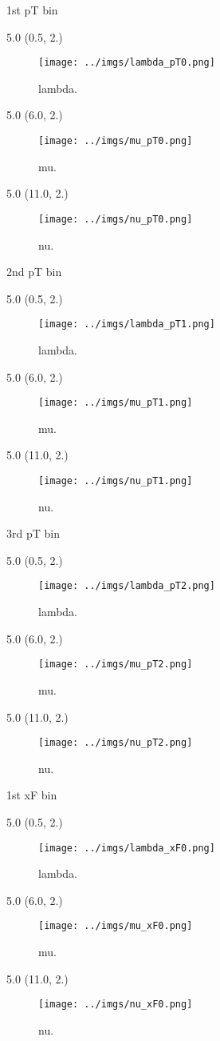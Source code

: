 \documentclass[12pt, xcolor={dvipsnames}, aspectratio = 169, sans,mathserif]{beamer}
\newenvironment{Pic}[2]
{
\begin{textblock}{#1} #2
\begin{figure}
}
{
\end{figure}
\end{textblock}
}
\begin{document}
%
%
%
\begin{frame}{1st pT bin}
\begin{Pic}{5.0}{(0.5, 2.)}
  \texttt{[image: ../imgs/lambda\_pT0.png]}
  \caption{lambda.}
\end{Pic}

\begin{Pic}{5.0}{(6.0, 2.)}
  \texttt{[image: ../imgs/mu\_pT0.png]}
  \caption{mu.}
\end{Pic}

\begin{Pic}{5.0}{(11.0, 2.)}
  \texttt{[image: ../imgs/nu\_pT0.png]}
  \caption{nu.}
\end{Pic}
\end{frame}

%
%
%
\begin{frame}{2nd pT bin}
\begin{Pic}{5.0}{(0.5, 2.)}
  \texttt{[image: ../imgs/lambda\_pT1.png]}
  \caption{lambda.}
\end{Pic}

\begin{Pic}{5.0}{(6.0, 2.)}
  \texttt{[image: ../imgs/mu\_pT1.png]}
  \caption{mu.}
\end{Pic}

\begin{Pic}{5.0}{(11.0, 2.)}
  \texttt{[image: ../imgs/nu\_pT1.png]}
  \caption{nu.}
\end{Pic}
\end{frame}

%
%
%
\begin{frame}{3rd pT bin}
\begin{Pic}{5.0}{(0.5, 2.)}
  \texttt{[image: ../imgs/lambda\_pT2.png]}
  \caption{lambda.}
\end{Pic}

\begin{Pic}{5.0}{(6.0, 2.)}
  \texttt{[image: ../imgs/mu\_pT2.png]}
  \caption{mu.}
\end{Pic}

\begin{Pic}{5.0}{(11.0, 2.)}
  \texttt{[image: ../imgs/nu\_pT2.png]}
  \caption{nu.}
\end{Pic}
\end{frame}

%
%
%
\begin{frame}{1st xF bin}
\begin{Pic}{5.0}{(0.5, 2.)}
  \texttt{[image: ../imgs/lambda\_xF0.png]}
  \caption{lambda.}
\end{Pic}

\begin{Pic}{5.0}{(6.0, 2.)}
  \texttt{[image: ../imgs/mu\_xF0.png]}
  \caption{mu.}
\end{Pic}

\begin{Pic}{5.0}{(11.0, 2.)}
  \texttt{[image: ../imgs/nu\_xF0.png]}
  \caption{nu.}
\end{Pic}
\end{frame}
\end{document}
